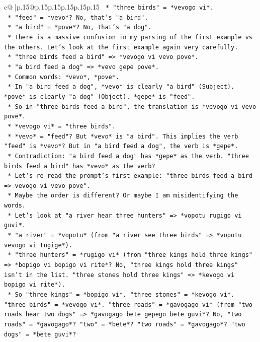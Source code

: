 \documentclass{article}
\begin{document}
{\begin{supertabular}{c@{$\;$}|p{.15\linewidth}@{}p{.15\linewidth}p{.15\linewidth}p{.15\linewidth}p{.15\linewidth}p{.15\linewidth}}
{{{\texttt{                *   "three birds" = *vevogo vi*.} \\
\texttt{                *   "feed" = *vevo*? No, that's "a bird".} \\
\texttt{                *   "a bird" = *pove*? No, that's "a dog".} \\
\texttt{            *   There is a massive confusion in my parsing of the first example vs the others. Let's look at the first example again very carefully.} \\
\texttt{            *   "three birds feed a bird" => *vevogo vi vevo pove*.} \\
\texttt{            *   "a bird feed a dog" => *vevo gepe pove*.} \\
\texttt{            *   Common words: *vevo*, *pove*.} \\
\texttt{            *   In "a bird feed a dog", *vevo* is clearly "a bird" (Subject). *pove* is clearly "a dog" (Object). *gepe* is "feed".} \\
\texttt{            *   So in "three birds feed a bird", the translation is *vevogo vi vevo pove*.} \\
\texttt{                *   *vevogo vi* = "three birds".} \\
\texttt{                *   *vevo* = "feed"? But *vevo* is "a bird". This implies the verb "feed" is *vevo*? But in "a bird feed a dog", the verb is *gepe*.} \\
\texttt{                *   Contradiction: "a bird feed a dog" has *gepe* as the verb. "three birds feed a bird" has *vevo* as the verb?} \\
\texttt{                *   Let's re{-}read the prompt's first example: "three birds feed a bird => vevogo vi vevo pove".} \\
\texttt{                *   Maybe the order is different? Or maybe I am misidentifying the words.} \\
\texttt{                *   Let's look at "a river hear three hunters" => *vopotu rugigo vi guvi*.} \\
\texttt{                    *   "a river" = *vopotu* (from "a river see three birds" => *vopotu vevogo vi tugige*).} \\
\texttt{                    *   "three hunters" = *rugigo vi* (from "three kings hold three kings" => *bopigo vi bopigo vi rite*? No, "three kings hold three kings" isn't in the list. "three stones hold three kings" => *kevogo vi bopigo vi rite*).} \\
\texttt{                    *   So "three kings" = *bopigo vi*. "three stones" = *kevogo vi*. "three birds" = *vevogo vi*. "three roads" = *gavogago vi* (from "two roads hear two dogs" => *gavogago bete gepego bete guvi*? No, "two roads" = *gavogago*? "two" = *bete*? "two roads" = *gavogago*? "two dogs" = *bete guvi*?} \\
}}}
\end{supertabular}}
\end{document}
